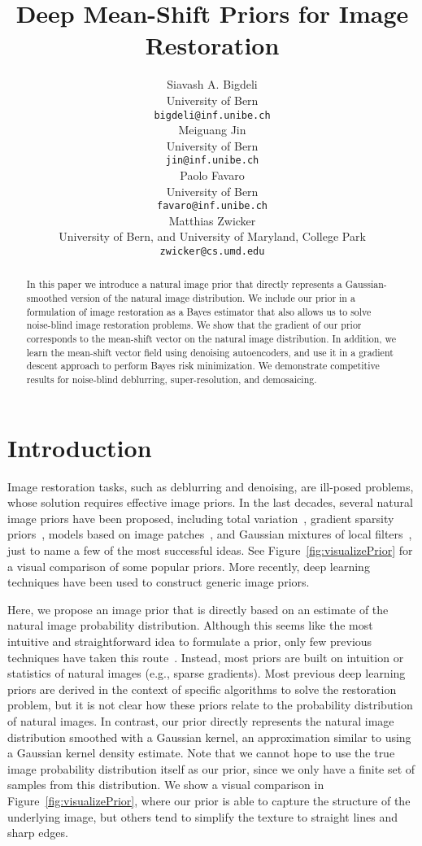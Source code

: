 \documentclass{article}
\title{Deep Mean-Shift Priors for Image Restoration}
\author{
Siavash A. Bigdeli \\
University of Bern\\
\texttt{bigdeli@inf.unibe.ch} \\
\And
Meiguang Jin\\
University of Bern\\
\texttt{jin@inf.unibe.ch} \\
\And
Paolo Favaro\\
University of Bern\\
\texttt{favaro@inf.unibe.ch} \\
\And
Matthias Zwicker \\
University of Bern, and University of Maryland, College Park\\
\texttt{zwicker@cs.umd.edu}\\
}
\begin{document}
\maketitle

\begin{abstract}
In this paper we introduce a natural image prior that directly represents a Gaussian-smoothed version of the natural image distribution. We include our prior in a formulation of image restoration as a Bayes estimator that also allows us to solve noise-blind image restoration problems. 
We show that the gradient of our prior corresponds to the mean-shift vector on the natural image distribution. In addition, we learn the mean-shift vector field using denoising autoencoders, and use it in a gradient descent approach to perform Bayes risk minimization. We demonstrate competitive results for noise-blind deblurring, super-resolution, and demosaicing.
\end{abstract}

\section{Introduction}
\label{sec:intro}

Image restoration tasks, such as deblurring and denoising, are ill-posed problems, whose solution requires effective image priors. 
In the last decades, several natural image priors have been proposed, including total variation~\cite{RUDIN1992259}, gradient sparsity priors~\cite{Fergus:2006:RCS}, models based on image patches~\cite{Buades2005NLM}, and Gaussian mixtures of local filters~\cite{Portilla2003SMG}, just to name a few of the most successful ideas. See Figure~\ref{fig:visualizePrior} for a visual comparison of some popular priors.
More recently, deep learning techniques have been used to construct generic image priors. 

Here, we propose an image prior that is directly based on an estimate of the natural image probability distribution. 
Although this seems like the most intuitive and straightforward idea to formulate a prior, only few previous techniques have taken this route~\cite{Levin2011NID}. Instead, most priors are built on intuition or statistics of natural images (e.g., sparse gradients). Most previous deep learning priors are derived in the context of specific algorithms to solve the restoration problem, but it is not clear how these priors relate to the probability distribution of natural images. 
In contrast, our prior directly represents the natural image distribution smoothed with a Gaussian kernel, an approximation similar to using a Gaussian kernel density estimate. Note that we cannot hope to use the true image probability distribution itself as our prior, since we only have a finite set of samples from this distribution.
We show a visual comparison in Figure~\ref{fig:visualizePrior}, where our prior is able to capture the structure of the underlying image, but others tend to simplify the texture to straight lines and sharp edges.
\end{document}
